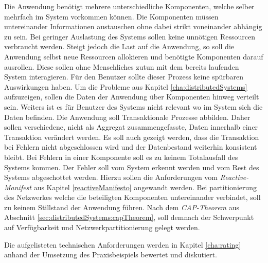 \begin{enumerate}
    Die Anwendung benötigt mehrere unterschiedliche Komponenten, welche selber mehrfach im System vorkommen können. Die Komponenten müssen untereinander Informationen austauschen ohne dabei strikt voneinander abhängig zu sein.
    Bei geringer Auslastung des Systems sollen keine unnötigen Ressourcen verbraucht werden. Steigt jedoch die Last auf die Anwendung, so soll die Anwendung selbst neue Ressourcen allokieren und benötigte Komponenten darauf ausrollen. Diese sollen ohne Menschliches zutun mit dem bereits laufenden System interagieren. Für den Benutzer sollte dieser Prozess keine spürbaren Auswirkungen haben.
    Um die Probleme aus Kapitel \ref{cha:distributedSystems} aufzuzeigen, sollen die Daten der Anwendung über Komponenten hinweg verteilt sein. Weiters ist es für Benutzer des Systems nicht relevant wo im System sich die Daten befinden. 
    Die Anwendung soll Transaktionale Prozesse abbilden. Daher sollen verschiedene, nicht als Aggregat zusammengefasste, Daten innerhalb einer Transaktion verändert werden. Es soll auch gezeigt werden, dass die Transaktion bei Fehlern nicht abgeschlossen wird und der Datenbestand weiterhin konsistent bleibt.
    Bei Fehlern in einer Komponente soll es zu keinem Totalausfall des Systems kommen. Der Fehler soll vom System erkennt werden und vom Rest des Systems abgeschottet werden. Hierzu sollen die Anforderungen vom \textit{Reactive-Manifest} aus Kapitel \ref{reactiveManifesto} angewandt werden.
    Bei partitionierung des Netzwerkes welche die beteiligten Komponenten untereinander verbindet, soll zu keinem Stillstand der Anwendung führen. Nach dem \textit{CAP-Theorem} aus Abschnitt \ref{sec:distributedSystems:capTheorem}, soll demnach der Schwerpunkt auf Verfügbarkeit und Netzwerkpartitionierung gelegt werden. 
\end{enumerate}
Die aufgelisteten technischen Anforderungen werden in Kapitel \ref{cha:rating} anhand der Umsetzung des Praxisbeispiels bewertet und diskutiert. 

